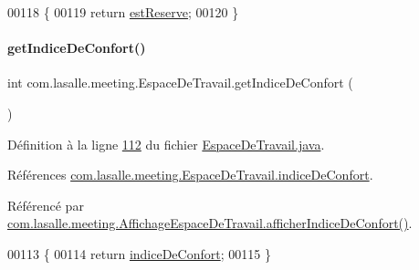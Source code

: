 \begin{DoxyCode}
00118     \{
00119         \textcolor{keywordflow}{return} \hyperlink{classcom_1_1lasalle_1_1meeting_1_1_espace_de_travail_a8913c30ae6b72ae4f35962b1ecfc496b}{estReserve};
00120     \}
\end{DoxyCode}
\mbox{\label{classcom_1_1lasalle_1_1meeting_1_1_espace_de_travail_a9d7b3bd8aa78a10c70851b477d0f522d}} 
\paragraph{\texorpdfstring{get\+Indice\+De\+Confort()}{getIndiceDeConfort()}}
{\footnotesize\ttfamily int com.\+lasalle.\+meeting.\+Espace\+De\+Travail.\+get\+Indice\+De\+Confort (\begin{DoxyParamCaption}{ }\end{DoxyParamCaption})}



Définition à la ligne \hyperlink{_espace_de_travail_8java_source_l00112}{112} du fichier \hyperlink{_espace_de_travail_8java_source}{Espace\+De\+Travail.\+java}.



Références \hyperlink{_espace_de_travail_8java_source_l00037}{com.\+lasalle.\+meeting.\+Espace\+De\+Travail.\+indice\+De\+Confort}.



Référencé par \hyperlink{_affichage_espace_de_travail_8java_source_l00116}{com.\+lasalle.\+meeting.\+Affichage\+Espace\+De\+Travail.\+afficher\+Indice\+De\+Confort()}.


\begin{DoxyCode}
00113     \{
00114         \textcolor{keywordflow}{return} \hyperlink{classcom_1_1lasalle_1_1meeting_1_1_espace_de_travail_a6a75c9c45ccb98895e02a1864bf4a41d}{indiceDeConfort};
00115     \}
\end{DoxyCode}
\mbox{\label{classcom_1_1lasalle_1_1meeting_1_1_espace_de_travail_af320aa4ad7711ed52b3b5aef1bd52dd1}} 
